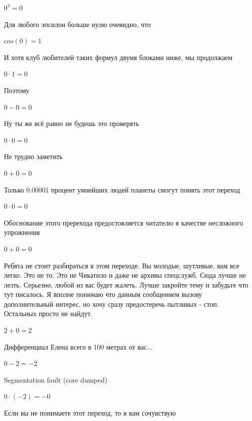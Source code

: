 \documentclass[12pt,a4paper,fleqn]{article}
\begin{document}
\begin{center}$0^{3} = 0$\end{center}
Для любого эпсилон больше нулю очевидно, что

\begin{center}$cos(0) = 1$\end{center}
И хотя клуб любителей таких формул двумя блоками ниже, мы продолжаем

\begin{center}$0 \cdot 1 = 0$\end{center}
Поэтому

\begin{center}$0-0 = 0$\end{center}
Ну ты же всё равно не будешь это проверять

\begin{center}$0 \cdot 0 = 0$\end{center}
Не трудно заметить

\begin{center}$0+0 = 0$\end{center}
Только 0.00001 процент умнейших людей планеты смогут понять этот переход

\begin{center}$0 \cdot 0 = 0$\end{center}
Обоснование этого пререхода предостовляется читателю в качестве несложного упрожнения

\begin{center}$0+0 = 0$\end{center}
Ребята не стоит разбираться в этом переходе. Вы молодые, шутливые, вам все легко. Это не то. Это не Чикатило и даже не архивы спецслужб. Сюда лучше не лезть. Серьезно, любой из вас будет жалеть. Лучше закройте тему и забудьте что тут писалось. Я вполне понимаю что данным сообщением вызову дополнительный интерес, но хочу сразу предостеречь пытливых - стоп. Остальных просто не найдут.

\begin{center}$2+0 = 2$\end{center}
Дифференциал Елена всего в 100 метрах от вас...

\begin{center}$0-2 = -2$\end{center}
Segmentation fault (core dumped)

\begin{center}$0 \cdot (-2) = -0$\end{center}
Если вы не понимаете этот переход, то я вам сочувствую
\end{document}
